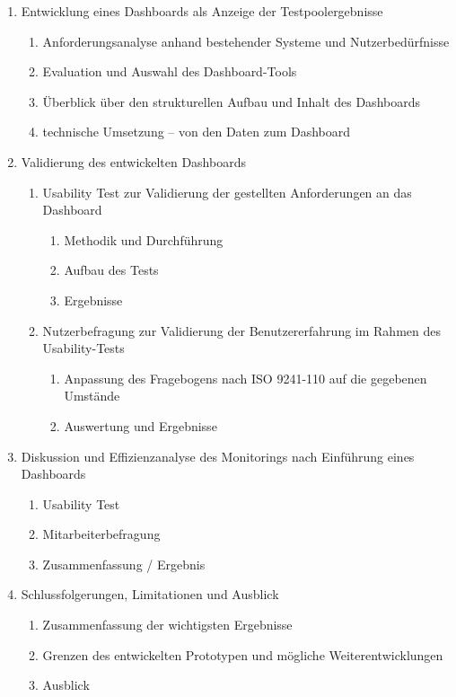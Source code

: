 \begin{enumerate}
    \item Entwicklung eines Dashboards als Anzeige der Testpoolergebnisse
    \begin{enumerate}
        \item Anforderungsanalyse anhand bestehender Systeme und Nutzerbedürfnisse
        \item Evaluation und Auswahl des Dashboard-Tools
        \item Überblick über den strukturellen Aufbau und Inhalt des Dashboards
        \item technische Umsetzung – von den Daten zum Dashboard
    \end{enumerate}

    \item Validierung des entwickelten Dashboards
    \begin{enumerate}
        \item Usability Test zur Validierung der gestellten Anforderungen an das Dashboard
        \begin{enumerate}
            \item Methodik und Durchführung
            \item Aufbau des Tests
            \item Ergebnisse
        \end{enumerate}
        \item Nutzerbefragung zur Validierung der Benutzererfahrung im Rahmen des Usability-Tests
        \begin{enumerate}
            \item Anpassung des Fragebogens nach ISO 9241-110 auf die gegebenen Umstände
            \item Auswertung und Ergebnisse
        \end{enumerate}
    \end{enumerate}

    \item Diskussion und Effizienzanalyse des Monitorings nach Einführung eines Dashboards
    \begin{enumerate}
        \item Usability Test
        \item Mitarbeiterbefragung
        \item Zusammenfassung / Ergebnis
    \end{enumerate}

    \item Schlussfolgerungen, Limitationen und Ausblick
    \begin{enumerate}
        \item Zusammenfassung der wichtigsten Ergebnisse
        \item Grenzen des entwickelten Prototypen und mögliche Weiterentwicklungen
        \item Ausblick
    \end{enumerate}

\end{enumerate}